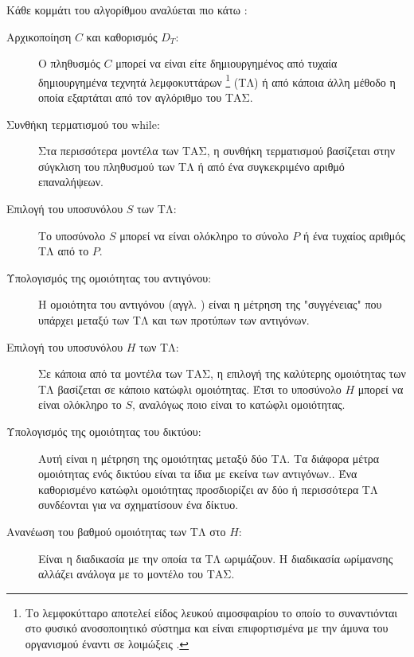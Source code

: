 \documentclass{assignment}
\begin{document}
Κάθε κομμάτι του αλγορίθμου αναλύεται πιο κάτω \cite{engelbrecht}:
\begin{description}
\item[Αρχικοποίηση $C$ και καθορισμός $D_T$:] Ο πληθυσμός $C$ μπορεί να είναι είτε δημιουργημένος από τυχαία δημιουργημένα τεχνητά λεμφοκυττάρων \footnote{Το λεμφοκύτταρο αποτελεί είδος λευκού αιμοσφαιρίου το οποίο το συναντιόνται στο φυσικό ανοσοποιητικό σύστημα και είναι επιφορτισμένα με την άμυνα του οργανισμού έναντι σε λοιμώξεις \cite{wiki:lymphocytes}.} (ΤΛ) ή από κάποια άλλη μέθοδο η οποία εξαρτάται από τον αγλόριθμο του ΤΑΣ.

\item[Συνθήκη τερματισμού του while:] Στα περισσότερα μοντέλα των ΤΑΣ, η συνθήκη τερματισμού βασίζεται στην σύγκλιση του πληθυσμού των ΤΛ ή από ένα συγκεκριμένο αριθμό επαναλήψεων.

\item[Επιλογή του υποσυνόλου $S$ των ΤΛ:] Το υποσύνολο $S$ μπορεί να είναι ολόκληρο το σύνολο $P$ ή ένα τυχαίος αριθμός ΤΛ από το $P$. 

\item[Υπολογισμός της ομοιότητας του αντιγόνου:] Η ομοιότητα του αντιγόνου (αγγλ. ) είναι η μέτρηση της "συγγένειας" που υπάρχει μεταξύ των ΤΛ και των προτύπων των αντιγόνων. 

\item[Επιλογή του υποσυνόλου $H$ των ΤΛ:] Σε κάποια από τα μοντέλα των ΤΑΣ, η επιλογή της καλύτερης ομοιότητας των ΤΛ βασίζεται σε κάποιο κατώφλι ομοιότητας. Έτσι το υποσύνολο $H$ μπορεί να είναι ολόκληρο το $S$, αναλόγως ποιο είναι το κατώφλι ομοιότητας.

\item[Υπολογισμός της ομοιότητας του δικτύου:] Αυτή είναι η μέτρηση της ομοιότητας μεταξύ δύο ΤΛ. Τα διάφορα μέτρα ομοιότητας ενός δικτύου είναι τα ίδια με εκείνα των αντιγόνων.. Ένα καθορισμένο κατώφλι ομοιότητας προσδιορίζει αν δύο ή περισσότερα ΤΛ συνδέονται για να σχηματίσουν ένα δίκτυο.

\item[Ανανέωση του βαθμού ομοιότητας των ΤΛ στο $H$:] Είναι η διαδικασία με την οποία τα ΤΛ ωριμάζουν. Η διαδικασία ωρίμανσης αλλάζει ανάλογα με το μοντέλο του ΤΑΣ.

\end{description}
\end{document}
